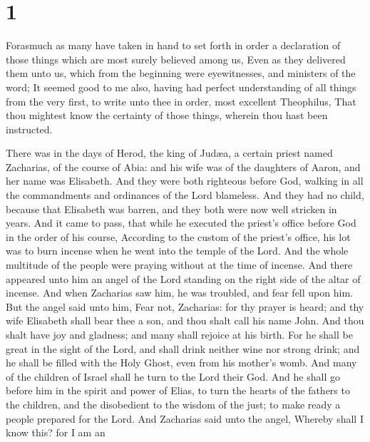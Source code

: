 \hypertarget{section}{%
\section{1}\label{section}}

 Forasmuch as many have taken in hand to set forth in order
a declaration of those things which are most surely believed among us,
 Even as they delivered them unto us, which from the
beginning were eyewitnesses, and ministers of the word;  It
seemed good to me also, having had perfect understanding of all things
from the very first, to write unto thee in order, most excellent
Theophilus,  That thou mightest know the certainty of those
things, wherein thou hast been instructed.

 There was in the days of Herod, the king of Judæa, a
certain priest named Zacharias, of the course of Abia: and his wife was
of the daughters of Aaron, and her name was Elisabeth.  And
they were both righteous before God, walking in all the commandments and
ordinances of the Lord blameless.  And they had no child,
because that Elisabeth was barren, and they both were now well stricken
in years.  And it came to pass, that while he executed the
priest's office before God in the order of his course, 
According to the custom of the priest's office, his lot was to burn
incense when he went into the temple of the Lord.  And the
whole multitude of the people were praying without at the time of
incense.  And there appeared unto him an angel of the Lord
standing on the right side of the altar of incense.  And
when Zacharias saw him, he was troubled, and fear fell upon him.
 But the angel said unto him, Fear not, Zacharias: for thy
prayer is heard; and thy wife Elisabeth shall bear thee a son, and thou
shalt call his name John.  And thou shalt have joy and
gladness; and many shall rejoice at his birth.  For he
shall be great in the sight of the Lord, and shall drink neither wine
nor strong drink; and he shall be filled with the Holy Ghost, even from
his mother's womb.  And many of the children of Israel
shall he turn to the Lord their God.  And he shall go
before him in the spirit and power of Elias, to turn the hearts of the
fathers to the children, and the disobedient to the wisdom of the just;
to make ready a people prepared for the Lord.  And
Zacharias said unto the angel, Whereby shall I know this? for I am an
